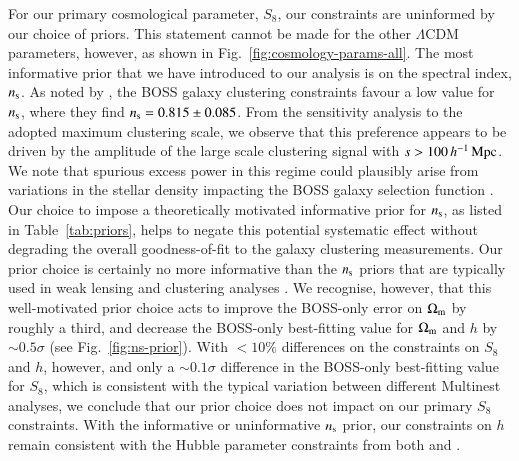 For our primary cosmological parameter, $S_8$, our constraints are uninformed by our choice of priors.    This statement cannot be made for the other $\Lambda$CDM parameters, however, as shown in Fig.~\ref{fig:cosmology-params-all}.   The most informative prior that we have introduced to our \tttp analysis is on the spectral index, $n_{\rm s}$.  As noted by \citet{troester/etal:2020}, the BOSS galaxy clustering constraints favour a low value for $n_{\rm s}$, where they find $n_{\rm s} = 0.815 \pm 0.085$. 
From the \citet{troester/etal:2020} sensitivity analysis to the adopted maximum clustering scale, we observe that this preference appears to be driven by the amplitude of the large scale clustering signal with $s > 100 \, h^{-1}\, {\rm Mpc}$.  We note that spurious excess power in this regime could plausibly arise from variations in the stellar density impacting the BOSS galaxy selection function \citep{ross/etal:2017}.  Our choice to impose a theoretically motivated informative prior for $n_{\rm s}$, as listed in Table~\ref{tab:priors}, helps to negate this potential systematic effect without degrading the overall goodness-of-fit to the galaxy clustering measurements.  Our prior choice is certainly no more informative than the $n_{\rm s}$ priors that are typically used in weak lensing and clustering analyses \citep[see for example][]{abbott/etal:2018,eBOSS/etal:2020}. 
We recognise, however, that this well-motivated prior choice acts to improve the BOSS-only error on $\Omega_{\rm m}$ by roughly a third, and decrease the BOSS-only best-fitting value for $\Omega_{\rm m}$ and $h$ by $\sim 0.5\sigma$ (see Fig.~\ref{fig:ns-prior}).  With $<10\%$ differences on the constraints on $S_8$ and $h$, however, and only a $\sim 0.1\sigma$ difference in the BOSS-only best-fitting value for $S_8$, which is consistent with the typical variation between different {\sc Multinest} analyses, we conclude that our prior choice does not impact on our primary $S_8$ constraints.   With the informative or uninformative $n_{\rm s}$ prior, our constraints on $h$ remain consistent with the Hubble parameter constraints from both \citet{planck/etal:2018} and \citet{riess/etal:2019}.

